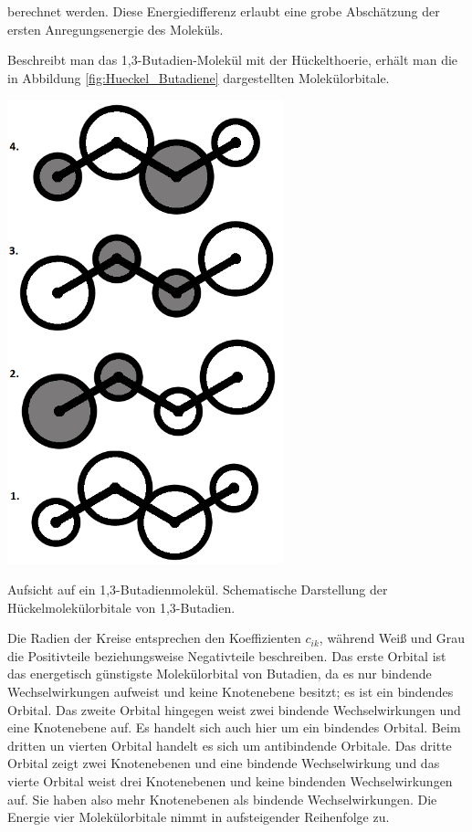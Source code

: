 berechnet werden. Diese Energiedifferenz erlaubt eine grobe Abschätzung der ersten Anregungsenergie des Moleküls.

Beschreibt man das 1,3-Butadien-Molekül mit der Hückelthoerie, erhält man die in Abbildung  \ref{fig:Hueckel_Butadiene} dargestellten Molekülorbitale.

\begin{dsafigure}
 \centering
 \includegraphics[width=8cm]{pics/Hueckel_Butadiene.png}
 \caption{Aufsicht auf ein 1,3-Butadienmolekül. Schematische Darstellung der Hückelmolekülorbitale von 1,3-Butadien.}
 \label{fig:Hueckel_Butadiene}
\end{dsafigure}

Die Radien der Kreise entsprechen den Koeffizienten $c_{ik}$, während Weiß und Grau die Positivteile beziehungsweise Negativteile beschreiben. Das erste Orbital ist das energetisch günstigste Molekülorbital von Butadien, da es nur bindende Wechselwirkungen aufweist und keine Knotenebene besitzt; es ist ein bindendes Orbital. Das zweite Orbital hingegen weist zwei bindende Wechselwirkungen und eine Knotenebene auf. Es handelt sich auch hier um ein bindendes Orbital. Beim dritten un vierten Orbital handelt es sich um antibindende Orbitale. Das dritte Orbital zeigt zwei Knotenebenen und eine bindende Wechselwirkung und das vierte Orbital weist drei Knotenebenen und keine bindenden Wechselwirkungen auf. Sie haben also mehr Knotenebenen als bindende Wechselwirkungen. Die Energie vier Molekülorbitale nimmt in aufsteigender Reihenfolge zu.
